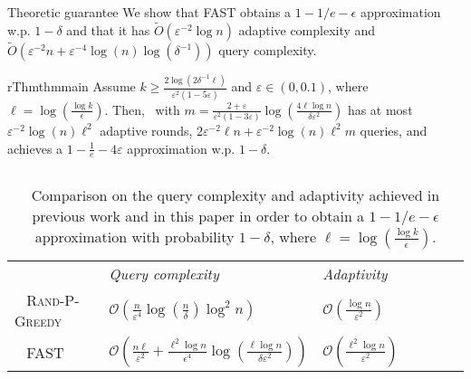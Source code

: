 \documentclass{beamer} %
\begin{document}
\begin{frame}{Theoretic guarantee}
We show that \textsc{FAST} obtains a $1-1/e-\epsilon$ approximation w.p. $1- \delta$ and that it has $\tilde{O}(\varepsilon^{-2} \log n)$  adaptive complexity and $\tilde{O}(\varepsilon^{-2} n +\varepsilon^{-4} \log(n)  \log(\delta^{-1}))$ query complexity.

\begin{restatable}{rThm}{thmmain}
\label{thm:main} 
Assume $k \geq \frac{2 \log(2\delta^{-1} \ell)}{\varepsilon^2 (1 - 5\varepsilon)}$ and $\varepsilon \in (0, 0.1)$, where  $\ell = \log(\frac{\log k}{\epsilon})$. Then, \algoptimized \ with $m = \frac{2 + \varepsilon}{\varepsilon^2(1 -  3\varepsilon)} \log(\frac{4\ell\log n}{\delta \varepsilon^2})$ has at most $\varepsilon^{-2} \log(n)  \ell^2$  adaptive rounds,   
$2\varepsilon^{-2}  \ell n +  \varepsilon^{-2} \log(n) \ell^2 m$ queries, and achieves a $1 - \frac{1}{e} - 4 \varepsilon$ approximation 
w.p. $1 - \delta$.
\end{restatable}

\begin{columns}
    \column{\dimexpr\paperwidth-15pt}
    \vspace{-15pt}
\begin{table}[h]
\begin{center}
\begin{tabular}{lllllll}\vspace{0.2cm}
        & \emph{Query complexity} & \emph{Adaptivity} &   \\\ \vspace{0.3cm}
 \textsc{Rand-P-Greedy}~\cite{chekuri2018submodular}& $\mathcal{O}\left(  \frac{n}{\varepsilon^4}  \log\left(\frac{n}{\delta}\right) \log^2 n\right)  $ & $ \mathcal{O}\left(\frac{\log n}{\varepsilon^2}  \right)$ & \\\ \vspace{0.3cm}
  \textsc{FAST} &     $\mathcal{O}\left(\frac{  n \ell}{\varepsilon^2} +  \frac{ \ell^2 \log n}{\epsilon^4}   \log(\frac{\ell\log n}{\delta \varepsilon^2})\right)$        &   $\mathcal{O}\left(\frac{ \ell^2 \log n}{\varepsilon^2}\right)$   & 
\end{tabular}
  \caption{Comparison on the query complexity and adaptivity achieved in previous work and in this paper in order to obtain a $1-1/e-\epsilon$ approximation with probability $1 - \delta$, where  $\ell = \log(\frac{\log k}{\epsilon})$.  }
  \label{tab:queries}
\end{center}
\end{table}
\end{columns}
\end{frame}
\end{document}
